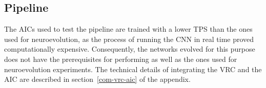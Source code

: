\subsection{Pipeline}
The AICs used to test the pipeline are trained with a lower TPS than the ones used for neuroevolution, as the process of running the CNN in real time proved computationally expensive. Consequently, the networks evolved for this purpose
does not have the prerequisites for performing as well as the ones used for neuroevolution experiments. The technical details of integrating the VRC and the AIC are described in section~\ref{com-vrc-aic} of the appendix.









































